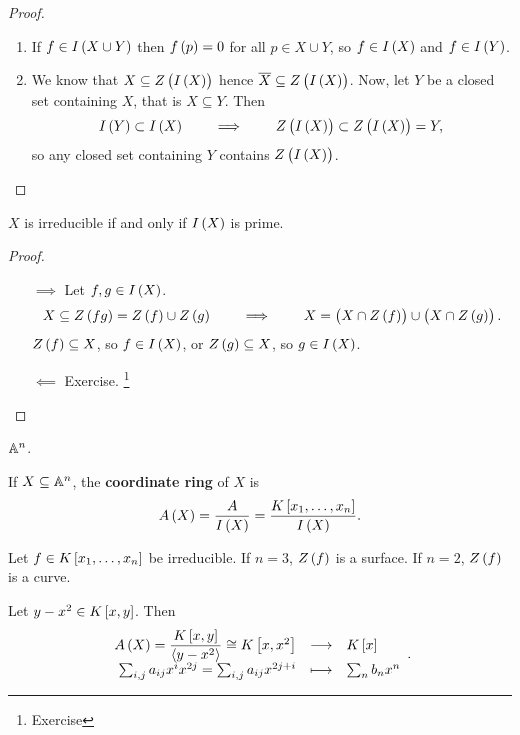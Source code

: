 \begin{proof}
\hfill
\begin{enumerate}
\item If $ f \in I\br{X \cup Y} $ then $ f\br{p} = 0 $ for all $ p \in X \cup Y $, so $ f \in I\br{X} $ and $ f \in I\br{Y} $.
\item We know that $ X \subseteq Z\br{I\br{X}} $ hence $ \overline{X} \subseteq Z\br{I\br{X}} $. Now, let $ Y $ be a closed set containing $ X $, that is $ X \subseteq Y $. Then
$$ I\br{Y} \subset I\br{X} \qquad \implies \qquad Z\br{I\br{X}} \subset Z\br{I\br{X}} = Y, $$
so any closed set containing $ Y $ contains $ Z\br{I\br{X}} $.
\end{enumerate}
\end{proof}

\begin{proposition}
$ X $ is irreducible if and only if $ I\br{X} $ is prime.
\end{proposition}

\begin{proof}
\hfill
\begin{itemize}
\item[$ \implies $] Let $ f, g \in I\br{X} $.
$$ X \subseteq Z\br{fg} = Z\br{f} \cup Z\br{g} \qquad \implies \qquad X = \br{X \cap Z\br{f}} \cup \br{X \cap Z\br{g}}. $$
$ Z\br{f} \subseteq X $, so $ f \in I\br{X} $, or $ Z\br{g} \subseteq X $, so $ g \in I\br{X} $.
\item[$ \impliedby $] Exercise. \footnote{Exercise}
\end{itemize}
\end{proof}

\begin{example}
$ \AA^n $.
\end{example}

\begin{definition}
If $ X \subseteq \AA^n $, the \textbf{coordinate ring} of $ X $ is
$$ A\br{X} = \dfrac{A}{I\br{X}} = \dfrac{K\sbr{x_1, \dots, x_n}}{I\br{X}}. $$
\end{definition}


\begin{example}
Let $ f \in K\sbr{x_1, \dots, x_n} $ be irreducible. If $ n = 3 $, $ Z\br{f} $ is a surface. If $ n = 2 $, $ Z\br{f} $ is a curve.
\end{example}

\begin{example}
Let $ y - x^2 \in K\sbr{x, y} $. Then
$$ \function{A\br{X} = \dfrac{K\sbr{x, y}}{\abr{y - x^2}} \cong K\sbr{x, x^2}}{K\sbr{x}}{\sum_{i, j} a_{ij}x^ix^{2j} = \sum_{i, j} a_{ij}x^{2j + i}}{\sum_n b_nx^n}. $$
\end{example}

